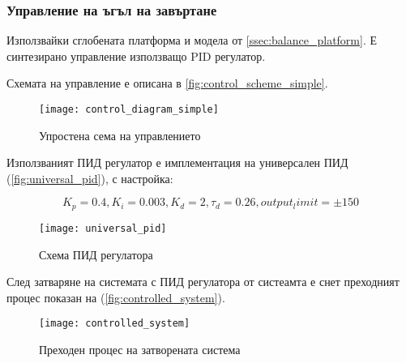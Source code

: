 \subsubsection{Управление на ъгъл на завъртане}

Използвайки сглобената платформа и модела от \autoref{ssec:balance_platform}.
Е синтезирано управление използващо PID регулатор.

Схемата на управление е описана в \autoref{fig:control_scheme_simple}.

\begin{figure}[htpb!]
    \centering
    \texttt{[image: control\_diagram\_simple]}
    \caption{Упростена сема на управлението}
    \label{fig:control_scheme_simple}
\end{figure}

Използваният ПИД регулатор е имплементация на универсален ПИД (\autoref{fig:universal_pid}), с настройка:

\begin{equation*}
    K_p=0.4, K_i=0.003, K_d=2, \tau_d=0.26, output_limit=\pm150
\end{equation*}


\begin{figure}[htpb!]
    \centering
    \texttt{[image: universal\_pid]}
    \caption{Схема ПИД регулатора}
    \label{fig:universal_pid}
\end{figure}

След затваряне на системата с ПИД регулатора от систеамта е снет преходният процес показан на (\autoref{fig:controlled_system}).

\begin{figure}[htpb!]
    \centering
    \texttt{[image: controlled\_system]}
    \caption{Преходен процес на затворената система}
    \label{fig:controlled_system}
\end{figure}







